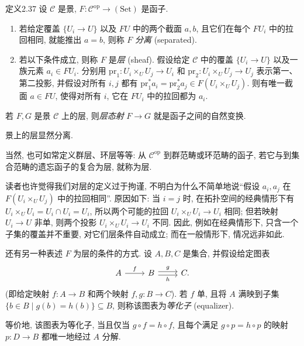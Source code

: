 \begin{origstatement}{定义}{2.37}\label{ch02:def237}
设 $\mathcal C$ 是景, $F:\mathcal C^{\mathrm{op}}\to(\mathrm{Set})$ 是函子.
\begin{enumerate}
\item[(i)] 若给定覆盖 $\{U_i\to U\}$ 以及 $FU$ 中的两个截面 $a,b$, 且它们在每个 $FU_i$ 中的拉回相同, 就能推出 $a=b$, 则称 $F$ \emph{分离} (separated).
\item[(ii)] 若以下条件成立, 则称 $F$ 是\emph{层} (sheaf). 假设给定 $\mathcal C$ 中的覆盖 $\{U_i\to U\}$ 以及一族元素 $a_i\in FU_i$. 分别用 $\mathrm{pr}_1:U_i\times_UU_j\to U_i$ 和 $\mathrm{pr}_2:U_i\times_UU_j\to U_j$ 表示第一、第二投影, 并假设对所有 $i,j$ 都有 $\mathrm{pr}_1^*a_i=\mathrm{pr}_2^*a_j\in F(U_i\times_UU_j)$. 则有唯一截面 $a\in FU$, 使得对所有 $i$, 它在 $FU_i$ 中的拉回都为 $a_i$.
\end{enumerate}

若 $F,G$ 是景 $\mathcal C$ 上的层, 则\emph{层态射} $F\to G$ 就是函子之间的自然变换.
\end{origstatement}

景上的层显然分离.

当然, 也可如常定义群层、环层等等: 从 $\mathcal C^{\mathrm{op}}$ 到群范畴或环范畴的函子, 若它与到集合范畴的遗忘函子的复合为层, 就称为层.

读者也许觉得我们对层的定义过于拘谨, 不明白为什么不简单地说“假设 $a_i,a_j$ 在 $F(U_i\times_UU_j)$ 中的拉回相同”. 原因如下: 当 $i=j$ 时, 在拓扑空间的经典情形下有 $U_i\times_UU_i=U_i\cap U_i=U_i$, 所以两个可能的拉回 $U_i\times_UU_i\to U_i$ 相同; 但若映射 $U_i\to U$ 非单, 则两个投影 $U_i\times_UU_i\to U_i$ 不同. 因此, 例如在经典情形下, 只含一个子集的覆盖并不重要, 对它们层条件自动成立; 而在一般情形下, 情况远非如此.

还有另一种表述 $F$ 为层的条件的方式. 设 $A,B,C$ 是集合, 并假设给定图表
\[
\begin{tikzcd}A\arrow[r,"f"]&B\arrow[r,shift left=.5ex,"g"]\arrow[r,shift right=.5ex,"h"']&C.\end{tikzcd}
\]
(即给定映射 $f:A\to B$ 和两个映射 $f,g:B\to C$). 若 $f$ 单, 且将 $A$ 满映到子集 $\{b\in B\mid g(b)=h(b)\}\subseteq B$, 则称该图表为\emph{等化子} (equalizer).

等价地, 该图表为等化子, 当且仅当 $g\circ f=h\circ f$, 且每个满足 $g\circ p=h\circ p$ 的映射 $p:D\to B$ 都唯一地经过 $A$ 分解.

